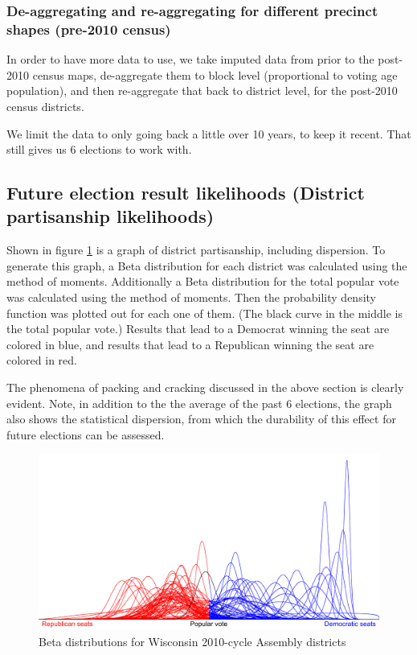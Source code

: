 \documentclass[preprint,12pt]{article}
\begin{document}
\subsubsection{De-aggregating and re-aggregating for different precinct shapes (pre-2010 census)}
 
In order to have more data to use, we take imputed data from prior to the post-2010 census maps, de-aggregate them to block level (proportional to voting age population), and then re-aggregate that back to district level, for the post-2010 census districts.
 
We limit the data to only going back a little over 10 years, to keep it recent.  That still gives us 6 elections to work with.
 
\subsection{Future election result likelihoods (District partisanship likelihoods)}
 
Shown in figure \ref{fig:Betas} is a graph of district partisanship, including dispersion.  To generate this graph, a Beta distribution for each district was calculated using the method of moments.  Additionally a Beta distribution for the total popular vote was calculated using the method of moments.  Then the probability density function was plotted out for each one of them.  (The black curve in the middle is the total popular vote.) Results that lead to a Democrat winning the seat are colored in blue, and results that lead to a Republican winning the seat are colored in red.
 
The phenomena of packing and cracking discussed in the above section is clearly evident.  Note, in addition to the the average of the past 6 elections, the graph also shows the statistical dispersion, from which the durability of this effect for future elections can be assessed.

\begin{figure}[htb!]
    \begin{center}
        \includegraphics[scale=0.25]{../Figures/WI2010/betas_cropped.png}
        \caption{Beta distributions for Wisconsin 2010-cycle Assembly districts}\label{fig:Betas}
    \end{center}
\end{figure}
 
\end{document}
